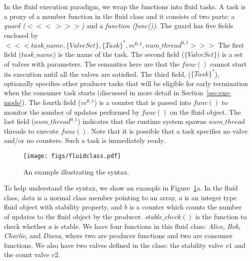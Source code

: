  In the fluid execution paradigm, we wrap the functions into fluid tasks. A task is a proxy of a member function in the fluid class and it consists of two parts: a {\it guard ($<<<\ >>>$)} and a {\it function (func())}. The guard has five fields enclosed by 
$<<<task\_name, \{ValveSet\}, \{Task\}^{*}, vc^{0,1}, num\_thread^{0,1}>>>$ 
The first field ($task\_name$) is the name of the task. The second field ($\{ValveSet\}$) is a set of valves with parameters. The semantics here are that the $func()$ cannot start its execution until all the valves are satisfied. The third field, ($\{Task\}^{*}$), optionally specifies other producer tasks that will be eligible for early termination when the consumer task starts (discussed in more detail in Section~\ref{sec:exe-mode}). The fourth field ($vc^{0,1}$) is a counter that is passed into $func()$ to monitor the number of updates performed by $func()$ on the fluid object. The last field ($num\_thread^{0,1}$) indicates that the runtime system spawns $num\_thread$ threads to execute $func()$. Note that it is possible that a task specifies no valve and/or no counters. Such a task is immediately ready.

\begin{figure}
\centering
\texttt{[image: figs/fluidclass.pdf]}
\vspace{-16pt}\caption{An example illustrating the syntax.}
\label{figs:syntaxexample}\vspace{-12pt}
\end{figure}

To help understand the syntax, we show an example in Figure~\ref{figs:syntaxexample}a. In the fluid class, $data$ is a normal class member pointing to an array, $a$ is an integer type fluid object with stability property, and $b$ is a counter which counts the number of updates to the fluid object by the producer. $stable\_check()$ is the function to check whether $a$ is stable. We have four functions in this fluid class: {\it Alice}, {\it Bob}, {\it Charlie}, and {\it Diana}, where two are producer functions and two are consumer functions. We also have two valves defined in the class: the stability valve $v1$ and the count valve $v2$. 


